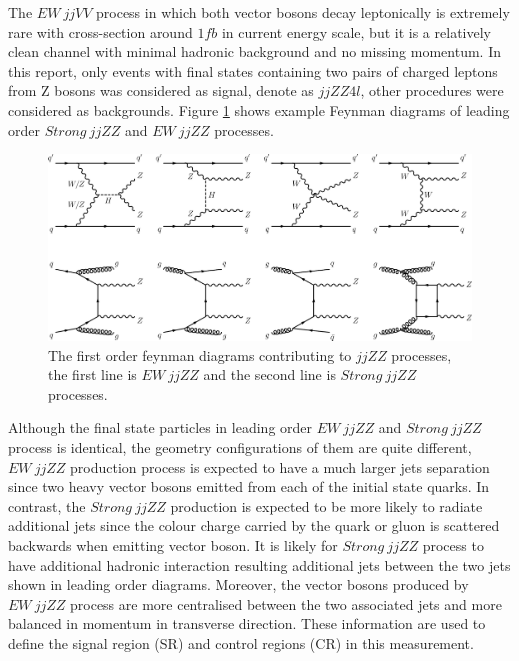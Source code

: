 \documentclass[12pt]{article}
\begin{document}
        \par The $EW\ jjVV$ process in which both vector bosons decay leptonically is extremely rare with cross-section around $1fb$ in current energy scale, 
        but it is a relatively clean channel with minimal hadronic background and no missing momentum. In this report, only events with final states containing 
        two pairs of charged leptons from Z bosons was considered as signal, denote as $jjZZ4l$, other procedures were considered as backgrounds.
        Figure \ref{fig:feynman} shows example Feynman diagrams of leading order $Strong\ jjZZ$ and $EW\ jjZZ$ processes\cite{ATLAS-CONF-2019-033}.  
        \begin{figure}[ht]
            \begin{centering}
            \includegraphics[scale=0.42]{ps/Feynman_diag.png}
            \caption{The first order feynman diagrams contributing to $jjZZ$ processes, the first line is $EW\ jjZZ$ and the second line is $Strong\ jjZZ$ processes.}
            \label{fig:feynman}
            \end{centering}
        \end{figure}
        \par Although the final state particles in leading order $EW\ jjZZ$ and $Strong\ jjZZ$ process is identical, the geometry configurations of them are quite 
        different, $EW\ jjZZ$ production process is expected to have a much larger jets separation since two heavy vector bosons emitted from each of the 
        initial state quarks. In contrast, the $Strong\ jjZZ$ production is expected to be more likely to radiate additional jets since the 
        colour charge carried by the quark or gluon is scattered backwards when emitting vector boson. It is likely for $Strong\ jjZZ$ process to have additional 
        hadronic interaction resulting additional jets between the two jets shown in leading order diagrams. Moreover, the vector bosons produced by 
        $EW\ jjZZ$ process are more centralised between the two associated jets and more balanced in momentum in transverse direction. These information are used 
        to define the signal region (SR) and control regions (CR) in this measurement.
\end{document}
